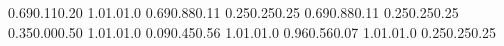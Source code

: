 \documentclass[a5paper,9pt]{scrreprt}
\begin{document}
\thispagestyle{empty}

\setslotsize{4.44cm}{0.203cm}
\settextframe{0.8mm}

\seteventcornerradius{0pt}


  {0.69}{0.11}{0.20}   {1.0}{1.0}{1.0}  %
  {0.69}{0.88}{0.11}   {0.25}{0.25}{0.25}  %
 {0.69}{0.88}{0.11}   {0.25}{0.25}{0.25}  %
 {0.35}{0.00}{0.50}   {1.0}{1.0}{1.0}  %
     {0.09}{0.45}{0.56}   {1.0}{1.0}{1.0}  %
 {0.96}{0.56}{0.07}   {1.0}{1.0}{1.0}  %
   {0.25}{0.25}{0.25}  %
\end{document}
